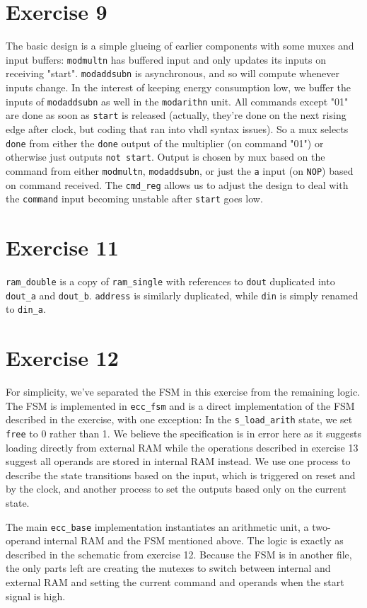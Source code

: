 \documentclass[a4paper,twoside]{article}
\newcommand{\atom}[1]{\mbox{\texttt{#1}}}
\begin{document}
\section*{Exercise 9}
The basic design is a simple glueing of earlier components with
some muxes and input buffers: \atom{modmultn} has buffered input and only
updates its inputs on receiving "start".  \atom{modaddsubn} is asynchronous, and
so will compute whenever inputs change.  In the interest of keeping energy
consumption low, we buffer the inputs of \atom{modaddsubn} as well in the
\atom{modarithn} unit. All commands except "01" are done as soon as \atom{start}
is released (actually, they're done on the next rising edge after clock, but
coding that ran into vhdl syntax issues). So a mux selects \atom{done} from
either the \atom{done} output of the multiplier (on command "01") or otherwise
just outputs \atom{not start}. Output is chosen by mux based on the command from
either \atom{modmultn}, \atom{modaddsubn}, or just the \atom{a} input (on
\atom{NOP}) based on command received. The \atom{cmd\_reg} allows us to adjust
the design to deal with the \atom{command} input becoming unstable after
\atom{start} goes low.

\section*{Exercise 11}
\atom{ram\_double} is a copy of \atom{ram\_single} with references to
\atom{dout} duplicated into \atom{dout\_a} and \atom{dout\_b}. \atom{address} is
similarly duplicated, while \atom{din} is simply renamed to \atom{din\_a}.

\section*{Exercise 12}
For simplicity, we've separated the FSM in this exercise from the remaining
logic. The FSM is implemented in \atom{ecc\_fsm} and is a direct implementation
of the FSM described in the exercise, with one exception: In the
\atom{s\_load\_arith} state, we set \atom{free} to 0 rather than 1. We believe
the specification is in error here as it suggests loading directly from external
RAM while the operations described in exercise 13 suggest all operands are
stored in internal RAM instead. We use one process to describe the state
transitions based on the input, which is triggered on reset and by the clock,
and another process to set the outputs based only on the current state.

The main \atom{ecc\_base} implementation instantiates an arithmetic unit, a
two-operand internal RAM and the FSM mentioned above. The logic is exactly as
described in the schematic from exercise 12. Because the FSM is in another file,
the only parts left are creating the mutexes to switch between internal and
external RAM and setting the current command and operands when the start signal
is high.
\end{document}
